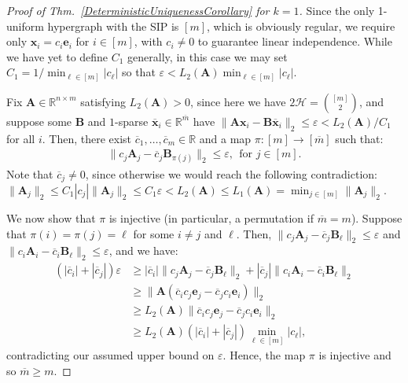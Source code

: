\documentclass[journal, twocolumn]{IEEEtran}
\begin{document}
\begin{proof}[Proof of Thm.~\ref{DeterministicUniquenessCorollary} for $k=1$]
Since the only 1-uniform hypergraph with the SIP is $[m]$, which is obviously regular, we require only $\mathbf{x}_i = c_i \mathbf{e}_i$ for $i \in [m]$, with $c_i \neq 0$ to guarantee  linear independence. While we have yet to define $C_1$ generally, in this case we may set $C_1 = 1/ \min_{\ell \in [m]} |c_{\ell}|$ so that $\varepsilon < L_2(\mathbf{A})  \min_{\ell \in [m]} |c_{\ell}|$. 

Fix $\mathbf{A} \in \mathbb{R}^{n \times m}$ satisfying $L_2(\mathbf{A}) > 0$, since here we have $2\mathcal{H} = {[m] \choose 2}$, and suppose some $\mathbf{B}$ and $1$-sparse $\mathbf{\overline x}_i \in \mathbb{R}^{\overline m}$ have  $\|\mathbf{A}\mathbf{x}_i - \mathbf{B}\mathbf{\overline x}_i\|_2 \leq \varepsilon < L_2(\mathbf{A}) / C_1$ for all $i$. Then, there exist $\overline{c}_1, \ldots, \overline{c}_m \in \mathbb{R}$ and a map $\pi: [m] \to [\overline m]$ such that:
\begin{align}\label{1D}
\|c_j\mathbf{A}_j - \overline{c}_j\mathbf{B}_{\pi(j)}\|_2 \leq \varepsilon,\ \ \text{for $j \in [m]$}.
\end{align} 
Note that $\overline{c}_j \neq 0$, since otherwise we would reach the following contradiction: $\|\mathbf{A}_j \|_2 \leq C_1 |c_j| \|\mathbf{A}_j \|_2  \leq C_1\varepsilon < L_2(\mathbf{A}) \leq L_1(\mathbf{A}) = \min_{j \in [m]} \|\mathbf{A}_{j}\|_2$. %

We now show that $\pi$ is injective (in particular, a permutation if $\overline m = m$). Suppose that $\pi(i) = \pi(j) = \ell$ for some $i \neq j$ and $\ell$. Then, $\|c_{j}\mathbf{A}_{j} - \overline{c}_{j}\mathbf{B}_{\ell}\|_2 \leq \varepsilon$ and $\|c_{i}\mathbf{A}_{i} - \overline{c}_{i} \mathbf{B}_{\ell}\|_2  \leq \varepsilon$, and we have: %
\begin{align*}
(|\overline{c}_{i}| + |\overline{c}_{j}|) \varepsilon
&\geq |\overline{c}_{i}| \|c_{j}\mathbf{A}_{j} - \overline{c}_{j}\mathbf{B}_{\ell}\|_2  + |\overline{c}_{j}| \|c_{i}\mathbf{A}_{i} - \overline{c}_{i} \mathbf{B}_{\ell}\|_2 \nonumber \\
&\geq \|\mathbf{A}(\overline{c}_{i}c_{j} \mathbf{e}_{j} - \overline{c}_{j}c_{i}\mathbf{e}_{i})\|_2 \nonumber \\ 
&\geq  L_2(\mathbf{A}) \|\overline{c}_{i}c_{j} \mathbf{e}_{j} - \overline{c}_{j}c_{i}\mathbf{e}_{i}\|_2 \nonumber \\
&\geq  L_2(\mathbf{A}) \left( |\overline{c}_{i}| + |\overline{c}_{j}| \right) \min_{\ell \in [m]} |c_\ell |,
\end{align*}
contradicting our assumed upper bound on $\varepsilon$. Hence, the map $\pi$ is injective and so $\overline m \geq m$. %


\end{proof}
\end{document}
